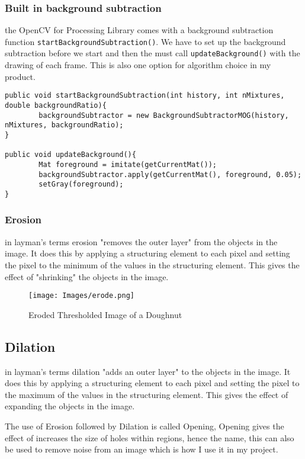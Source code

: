 \documentclass[a4paper]{report}
\begin{document}
\subsubsection{Built in background subtraction}
the OpenCV for Processing Library comes with a background subtraction function \verb|startBackgroundSubtraction()|. We have to set up the background subtraction before we start and then the must call \verb|updateBackground()| with the drawing of each frame. This is also one option for algorithm choice in my product.

\begin{lstlisting}
public void startBackgroundSubtraction(int history, int nMixtures, double backgroundRatio){
		backgroundSubtractor = new BackgroundSubtractorMOG(history, nMixtures, backgroundRatio);
}
	
public void updateBackground(){
		Mat foreground = imitate(getCurrentMat());
		backgroundSubtractor.apply(getCurrentMat(), foreground, 0.05);
		setGray(foreground);
}
\end{lstlisting}

\subsubsection{Erosion}
in layman's terms erosion "removes the outer layer" from the objects in the image. It does this by applying a structuring element to each pixel and setting the pixel to the minimum of the values in the structuring element. This gives the effect of "shrinking" the objects in the image.

\clearpage
\begin{figure}[!ht]
\centering
\texttt{[image: Images/erode.png]}
\caption{\label{fig:Doughnut} Eroded Thresholded Image of a Doughnut}
\end{figure}

\subsection{Dilation}
in layman's terms dilation "adds an outer layer" to the objects in the image. It does this by applying a structuring element to each pixel and setting the pixel to the maximum of the values in the structuring element. This gives the effect of expanding the objects in the image.

The use of Erosion followed by Dilation is called Opening, Opening gives the effect of increases the size of holes within regions, hence the name, this can also be used to remove noise from an image which is how I use it in my project.
\end{document}
